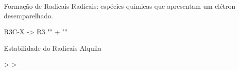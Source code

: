 \documentclass[presentation,professionalfonts,aspectratio=169]{beamer}
\begin{document}
\begin{frame}[label={sec:org76c43df}]{Formação de Radicais}
\alert{Radicais:} espécies químicas que apresentam um elétron desemparelhado.

\begin{reaction}
	R3C-X -> R3 ""  +  ""
\end{reaction}


\begin{bclogo}[couleur=blue!30 , arrondi=0.1 , logo=\bcplume , epBarre=3.5]{Estabilidade do Radicais Alquila}
\begin{center}	
 \qquad > \qquad {} \qquad > \qquad {}
\end{center}
\end{bclogo}
\end{frame}
\end{document}
